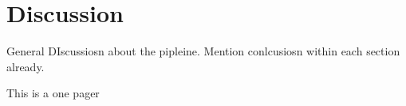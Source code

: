 \chapter{Discussion}
\label{ch:discussion}
General DIscussiosn about the pipleine. Mention conlcusiosn within each section already.

This is a one pager
